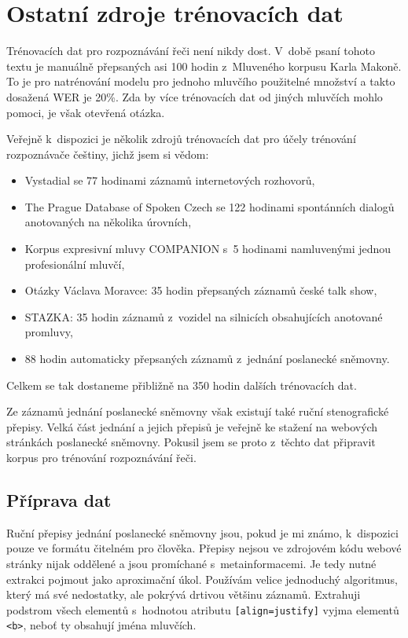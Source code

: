 \chapter{Ostatní zdroje trénovacích dat}
\label{kap:svolocz}

Trénovacích dat pro rozpoznávání řeči není nikdy dost. V~době psaní tohoto textu
je manuálně přepsaných asi 100 hodin z~Mluveného korpusu Karla Makoně. To je pro
natrénování modelu pro jednoho mluvčího použitelné množství a takto dosažená WER
je 20\%. Zda by více trénovacích dat od jiných mluvčích mohlo pomoci, je však
otevřená otázka.

Veřejně k~dispozici je několik zdrojů trénovacích dat pro účely trénování
rozpoznávače češtiny, jichž jsem si vědom:
\begin{itemize}
\item{
    Vystadial\cite{vystadialarticle} se 77 hodinami záznamů internetových
    rozhovorů\cite{vystadialdata},
}
\item{
    The Prague Database of Spoken Czech\cite{pdtscarticle} se 122 hodinami
    spontánních dialogů anotovaných na několika úrovních\cite{pdtscdata},
}
\item{
    Korpus expresivní mluvy COMPANION s~5 hodinami namluvenými jednou
    profesionální mluvčí\cite{companiondata},
}
\item{
    Otázky Václava Moravce: 35 hodin přepsaných záznamů české talk
    show\cite{ovmdata},
}
\item{
    STAZKA: 35 hodin záznamů z~vozidel na silnicích obsahujících anotované
    promluvy\cite{stazkadata},
}
\item{
    88 hodin automaticky přepsaných záznamů z~jednání poslanecké
    sněmovny\cite{pspdata}.
}
\end{itemize}
Celkem se tak dostaneme přibližně na 350 hodin dalších trénovacích dat.

Ze záznamů jednání poslanecké sněmovny však existují také ruční stenografické
přepisy. Velká část jednání a jejich přepisů je veřejně ke stažení na webových
stránkách poslanecké sněmovny. Pokusil jsem se proto z~těchto dat připravit
korpus pro trénování rozpoznávání řeči.

\section{Příprava dat}

Ruční přepisy jednání poslanecké sněmovny jsou, pokud je mi známo, k~dispozici
pouze ve formátu čitelném pro člověka. Přepisy nejsou ve zdrojovém kódu webové
stránky nijak oddělené a jsou promíchané s~metainformacemi. Je tedy nutné
extrakci pojmout jako aproximační úkol. Používám velice jednoduchý algoritmus,
který má své nedostatky, ale pokrývá drtivou většinu záznamů. Extrahuji podstrom
všech elementů s~hodnotou atributu \texttt{[align=justify]} vyjma elementů
\texttt{<b>}, neboť ty obsahují jména mluvčích.

